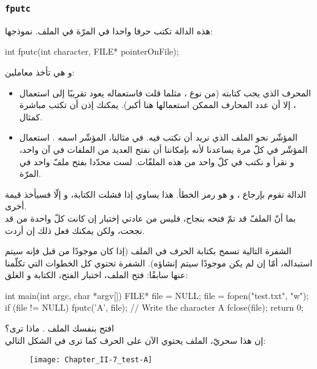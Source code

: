 \subsubsection{\texttt{fputc}}

هذه الدالة تكتب حرفا واحدا في المرّة في الملف. نموذجها:

\begin{Csource}
int fputc(int character, FILE* pointerOnFile);
\end{Csource}

و هي تأخذ معاملين:

\begin{itemize}
  \item المحرف الذي يجب كتابته (من نوع
،
مثلما قلت فاستعماله يعود تقريبًا إلى استعمال
،
إلا أن عدد المحارف الممكن استعمالها هنا أكبر). يمكنك إذن أن تكتب مباشرة
كمثال.
  \item المؤشّر نحو الملف الذي نريد أن نكتب فيه. في مثالنا، المؤشّر اسمه
.
استعمال المؤشّر في كلّ مرة يساعدنا لأنه بإمكاننا أن نفتح العديد من الملفات في آن واحد، و نقرأ و نكتب في كلّ واحد من هذه الملفّات. لست محدّدا بفتح ملفّ واحد في المرّة.
\end{itemize}

الدالة تقوم بإرجاع
،
و هو رمز الخطأ. هذا 
يساوي
إذا فشلت الكتابة، و إلّا فسيأخذ قيمة أخرى.\\
بما أنّ الملفّ قد تمّ فتحه بنجاح، فليس من عادتي إختبار إن كانت كلّ واحدة من
قد نجحت، ولكن يمكنك فعل ذلك إن أردت.

الشفرة التالية تسمح بكتابة الحرف
في الملف
(إذا كان موجودًا من قبل فإنه سيتم استبداله، أمّا إن لم يكن موجودًا سيتم إنشاؤه). الشفرة تحتوي كل الخطوات التي تكلّمنا عنها سابقًا: فتح الملف، اختبار الفتح، الكتابة و الغلق:

\begin{Csource}
int main(int argc, char *argv[])
{
    FILE* file = NULL;
    file = fopen("test.txt", "w");
    if (file != NULL)
    {
        fputc('A', file); // Write the character A
        fclose(file);
    }
    return 0;
}
\end{Csource}

افتح بنفسك الملف
.
ماذا ترى؟\\
إن هذا سحريّ، الملف يحتوي الآن على الحرف
كما ترى في الشكل التالي:

\begin{figure}[H]
	\centering
	\texttt{[image: Chapter\_II-7\_test-A]}
\end{figure}

